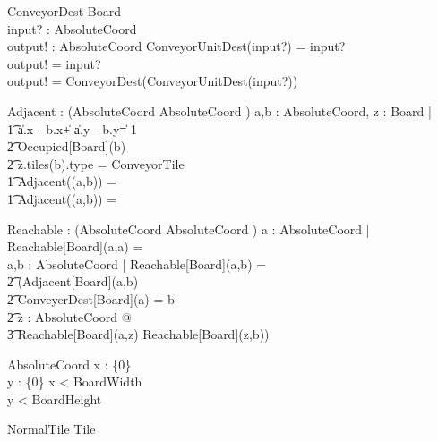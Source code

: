 \documentclass[12pt]{article}
\begin{document}
\begin{schema}{ConveyorDest}
\Xi Board \\
input? : AbsoluteCoord \\
output! : AbsoluteCoord
\where
\IF  ConveyorUnitDest(input?) = input? \\
\THEN output! = input? \\
\ELSE output! = ConveyorDest(ConveyorUnitDest(input?))
\end{schema}

\begin{gendef}[Board]
Adjacent : \power (AbsoluteCoord \times AbsoluteCoord \pfun \bool)
\where
\forall a,b : AbsoluteCoord, z : Board |\\ \t1
\IF \|a.x - b.x\| + \|a.y - b.y\| = 1 \\ \t2
\neg Occupied[Board](b) \\ \t2
z.tiles(b).type \not = ConveyorTile \\ \t1
\THEN Adjacent((a,b)) = \true \\ \t1
\ELSE Adjacent((a,b)) = \false
\end{gendef}

\begin{gendef}[Board]
Reachable : \power (AbsoluteCoord \times AbsoluteCoord \pfun \bool)
\where
\forall a : AbsoluteCoord | Reachable[Board](a,a) = \true \\
\forall a,b : AbsoluteCoord | Reachable[Board](a,b) = \\ \t2 (Adjacent[Board](a,b) \: \vee \\ \t2 ConveyerDest[Board](a) = b \: \vee \\ \t2
\exists z : AbsoluteCoord @ \\ \t3 Reachable[Board](a,z) \wedge Reachable[Board](z,b))
\end{gendef}

\begin{schema}{AbsoluteCoord}
x : \nat \cup \{0\} \\
y : \nat \cup \{0\}
\where
x < BoardWidth \\
y < BoardHeight
\end{schema}


\begin{schema}{NormalTile}
Tile
\end{schema}
\end{document}
